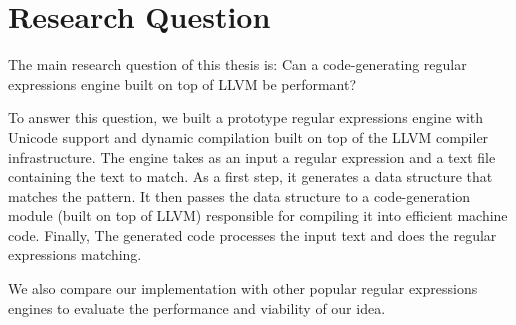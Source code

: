 \section{Research Question}\label{researchq}

The main research question of this thesis is: Can a code-generating regular expressions engine built on top of LLVM be performant?

To answer this question, we built a prototype regular expressions engine with Unicode support and dynamic compilation built on top of the LLVM compiler infrastructure. The engine takes as an input a regular expression and a text file containing the text to match. As a first step, it generates a data structure that matches the pattern. It then passes the data structure to a code-generation module (built on top of LLVM) responsible for compiling it into efficient machine code. Finally, The generated code processes the input text and does the regular expressions matching.

We also compare our implementation with other popular regular expressions engines to evaluate the performance and viability of our idea. 